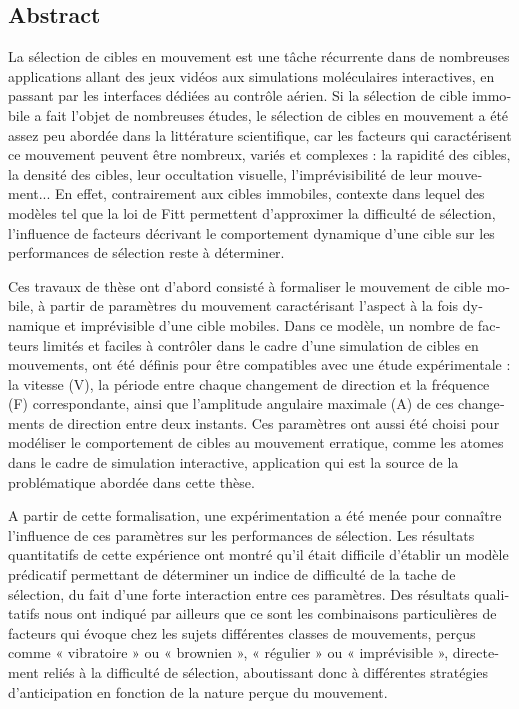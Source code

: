 \begin{otherlanguage}{english}
%
\subsection*{Abstract}

La sélection de cibles en mouvement est une tâche récurrente dans de nombreuses applications allant des jeux vidéos aux simulations moléculaires interactives, en passant par les interfaces dédiées au contrôle aérien. Si la sélection de cible immobile a fait l’objet de nombreuses études, le sélection de cibles en mouvement a été assez peu abordée dans la littérature scientifique, car les facteurs qui caractérisent ce mouvement peuvent être nombreux, variés et complexes : la rapidité des cibles, la densité des cibles, leur occultation visuelle, l’imprévisibilité de leur mouvement... En effet, contrairement aux cibles immobiles, contexte dans lequel des modèles tel que la loi de Fitt permettent d’approximer la difficulté de sélection, l’influence de facteurs décrivant le comportement dynamique d’une cible sur les performances de sélection reste à déterminer.

Ces travaux de thèse ont d’abord consisté à formaliser le mouvement de cible mobile, à partir de paramètres du mouvement caractérisant l’aspect à la fois dynamique et imprévisible d’une cible mobiles. Dans ce modèle, un nombre de facteurs limités et faciles à contrôler dans le cadre d’une simulation de cibles en mouvements, ont été définis pour être compatibles avec une étude expérimentale : la vitesse (V), la période entre chaque changement de direction et la fréquence (F) correspondante, ainsi que l’amplitude angulaire maximale (A) de ces changements de direction entre deux instants. Ces paramètres ont aussi été choisi pour modéliser le comportement de cibles au mouvement erratique, comme les atomes dans le cadre de simulation interactive, application qui est la source de la problématique abordée dans cette thèse.

A partir de cette formalisation, une expérimentation a été menée pour connaître l’influence de ces paramètres sur les performances de sélection. Les résultats quantitatifs de cette expérience ont montré qu’il était difficile d’établir un modèle prédicatif permettant de déterminer un indice de difficulté de la tache de sélection, du fait d’une forte interaction entre ces paramètres. Des résultats qualitatifs nous ont indiqué par ailleurs que ce sont les combinaisons particulières de facteurs qui évoque chez les sujets différentes classes de mouvements, perçus comme « vibratoire » ou « brownien », « régulier » ou « imprévisible », directement reliés à la difficulté de sélection, aboutissant donc à différentes stratégies d’anticipation en fonction de la nature perçue du mouvement.


\end{otherlanguage}

